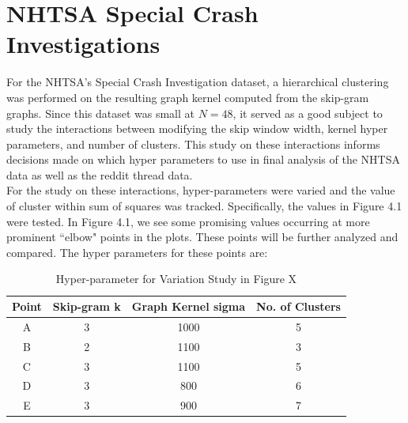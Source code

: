 %
%
%




\section{NHTSA Special Crash Investigations}
\hspace*{0.3cm} For the NHTSA's Special Crash Investigation dataset, a hierarchical clustering was performed on the resulting graph kernel computed from the skip-gram graphs. Since this dataset was small at $N=48$, it served as a good subject to study the interactions between modifying the skip window width, kernel hyper parameters, and number of clusters. This study on these interactions informs decisions made on which hyper parameters to use in final analysis of the NHTSA data as well as the reddit thread data. \\
 
For the study on these interactions, hyper-parameters were varied and the value of cluster within sum of squares was tracked. Specifically, the values in Figure 4.1 were tested. In Figure 4.1, we see some promising values occurring at more prominent ``elbow" points in the plots. These points will be further analyzed and compared. The hyper parameters for these points are:\\
 
 \begin{table}
\centering
\begin{tabular}{c|c|c|c}
Point&Skip-gram k& Graph Kernel sigma&No. of Clusters \\
\hline
A&3&1000&5\\
B&2&1100&3\\
C&3&1100&5\\
D&3&800&6\\
E&3&900&7
\end{tabular}
\caption{Hyper-parameter for Variation Study in Figure X}
\end{table}
 

